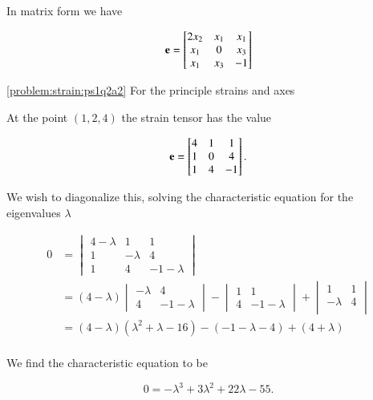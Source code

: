 {In matrix form we have

\begin{equation}\label{eqn:continuumProblemSet1:250}
\mathbf{e} =
\begin{bmatrix}
2 x_2 & x_1 & x_1 \\
x_1 & 0 & x_3 \\
x_1 & x_3 & -1 \\
\end{bmatrix}
\end{equation}

\ref{problem:strain:ps1q2a2} For the principle strains and axes

At the point $(1, 2, 4)$ the strain tensor has the value

\begin{equation}\label{eqn:continuumProblemSet1:270}
\mathbf{e} =
\begin{bmatrix}
4 & 1 & 1 \\
1 & 0 & 4 \\
1 & 4 & -1
\end{bmatrix}.
\end{equation}

We wish to diagonalize this, solving the characteristic equation for the eigenvalues $\lambda$

\begin{align*}
0 &=
\begin{vmatrix}
4 -\lambda & 1 & 1 \\
1 & -\lambda & 4 \\
1 & 4 & -1 -\lambda
\end{vmatrix} \\
&=
(4 -\lambda )
\begin{vmatrix}
 -\lambda & 4 \\
 4 & -1 -\lambda
\end{vmatrix}
-
\begin{vmatrix}
1 & 1 \\
4 & -1 -\lambda
\end{vmatrix}
+
\begin{vmatrix}
1 & 1 \\
-\lambda & 4 \\
\end{vmatrix} \\
&=
(4 - \lambda)(\lambda^2 + \lambda - 16)
-(-1 -\lambda - 4)
+(4 + \lambda) \\
\end{align*}

We find the characteristic equation to be

\begin{equation}\label{eqn:continuumProblemSet1:290}
0 = -\lambda^3 + 3 \lambda^2 + 22\lambda - 55.
\end{equation}

}
